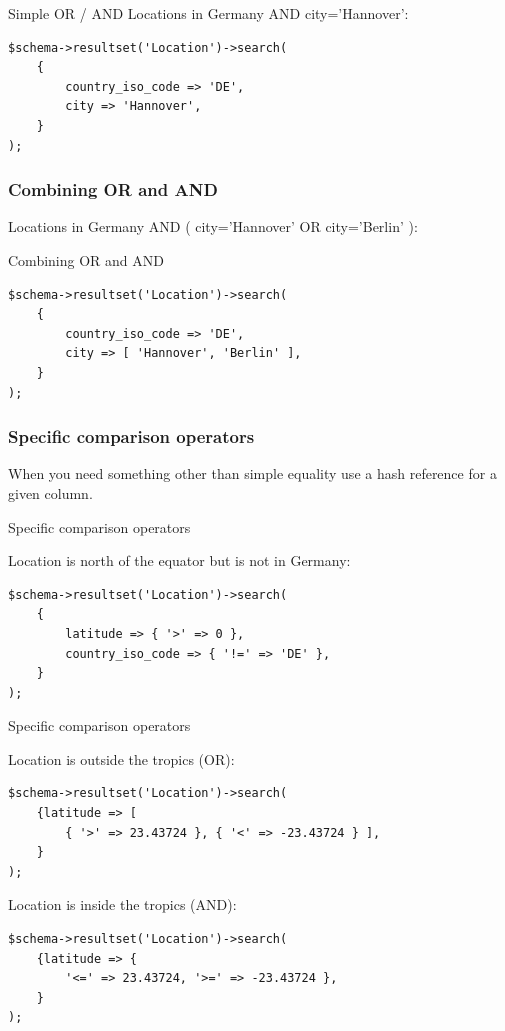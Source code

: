 \begin{frame}[fragile]{Simple OR / AND}
Locations in Germany AND city='Hannover':

\begin{lstlisting}
$schema->resultset('Location')->search(
    {
        country_iso_code => 'DE',
        city => 'Hannover',
    }
);
\end{lstlisting}
\end{frame}

\subsubsection{Combining OR and AND}

Locations in Germany AND ( city='Hannover' OR city='Berlin' ):

\begin{frame}[fragile]{Combining OR and AND}

\begin{lstlisting}
$schema->resultset('Location')->search(
    {
        country_iso_code => 'DE',
        city => [ 'Hannover', 'Berlin' ],
    }
);
\end{lstlisting}
\end{frame}

\subsubsection{Specific comparison operators}

When you need something other than simple equality use a hash reference for a given column.

\begin{frame}[fragile]{Specific comparison operators}

Location is north of the equator but is not in Germany:

\begin{lstlisting}
$schema->resultset('Location')->search(
    {
        latitude => { '>' => 0 },
        country_iso_code => { '!=' => 'DE' },
    }
);
\end{lstlisting}
\end{frame}

\begin{frame}[fragile]{Specific comparison operators}

Location is outside the tropics (OR):

\begin{lstlisting}
$schema->resultset('Location')->search(
    {latitude => [ 
        { '>' => 23.43724 }, { '<' => -23.43724 } ],
    }
);
\end{lstlisting}

Location is inside the tropics (AND):

\begin{lstlisting}
$schema->resultset('Location')->search(
    {latitude => { 
        '<=' => 23.43724, '>=' => -23.43724 },
    }
);
\end{lstlisting}
\end{frame}

